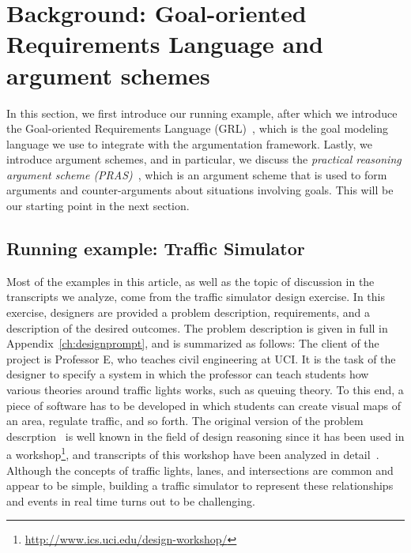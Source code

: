 \section{Background: Goal-oriented Requirements Language and argument schemes}
\label{sect:background}

In this section, we first introduce our running example, after which we introduce the Goal-oriented Requirements Language (GRL)~\cite{Amyot:2010:EGM:1841349.1841356}, which is the goal modeling language we use to integrate with the argumentation framework. Lastly, we introduce argument schemes, and in particular, we discuss the \emph{practical reasoning argument scheme (PRAS)}~\cite{atkinson2007}, which is an argument scheme that is used to form arguments and counter-arguments about situations involving goals. This will be our starting point in the next section.

\subsection{Running example: Traffic Simulator}
\label{sect:goals:runningexample}

Most of the examples in this article, as well as the topic of discussion in the transcripts we analyze, come from the traffic simulator design exercise. In this exercise, designers are provided a problem description, requirements, and a description of the desired outcomes. The problem description is given in full in Appendix~\ref{ch:designprompt}, %
 and is summarized as follows: The client of the project is Professor E, who teaches civil engineering at UCI. %
 It is the task of the designer to specify a system in which the professor can teach students how various theories around traffic lights works, such as queuing theory. To this end, a piece of software has to be developed in which students can create visual maps of an area, regulate traffic, and so forth. The original version of the problem descrption~\cite{UCIworkshop} is well known in the field of design reasoning since it has been used in a workshop\footnote{\url{http://www.ics.uci.edu/design-workshop/}}, and transcripts of this workshop have been analyzed in detail~\cite{Petre:2013:SDA:2535028}. Although the concepts of traffic lights, lanes, and intersections are common and appear to be simple, building a traffic simulator to represent these relationships and events in real time turns out to be challenging.

